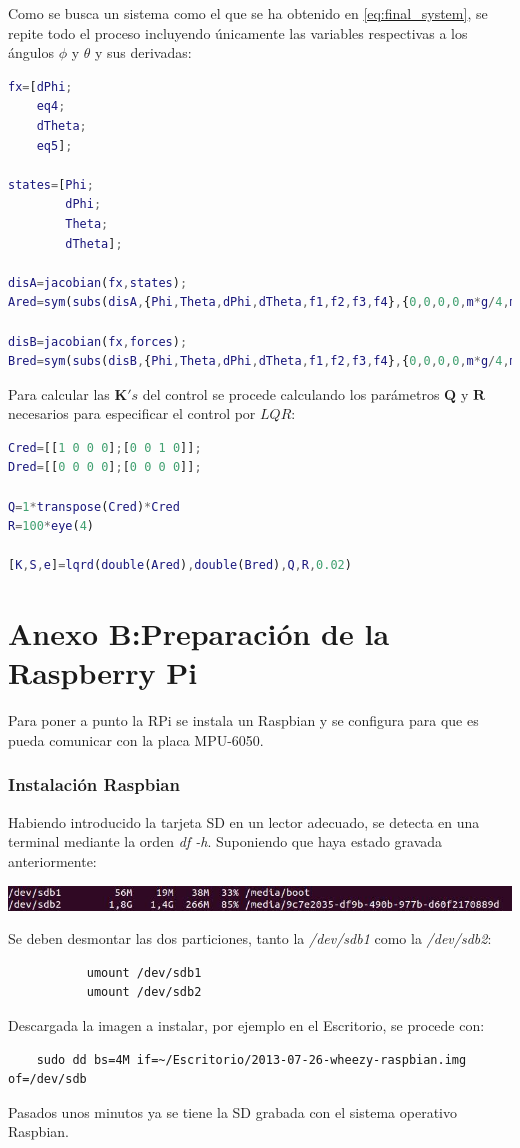 \documentclass[twoside,11pt]{book}
\begin{document}
Como se busca un sistema como el que se ha obtenido en \ref{eq:final_system}, se repite todo el proceso incluyendo únicamente las variables respectivas a los ángulos $\phi$ y $\theta$ y sus derivadas:

\singlespacing
\begin{lstlisting}[language=Matlab,firstnumber=136]
fx=[dPhi;
    eq4;
    dTheta;
    eq5];

states=[Phi;
        dPhi;
        Theta;
        dTheta];
        
disA=jacobian(fx,states);
Ared=sym(subs(disA,{Phi,Theta,dPhi,dTheta,f1,f2,f3,f4},{0,0,0,0,m*g/4,m*g/4,m*g/4,m*g/4}))

disB=jacobian(fx,forces);
Bred=sym(subs(disB,{Phi,Theta,dPhi,dTheta,f1,f2,f3,f4},{0,0,0,0,m*g/4,m*g/4,m*g/4,m*g/4}))        
\end{lstlisting}
\onehalfspacing

Para calcular las $\mathbf{K}'s$ del control se procede calculando los parámetros $\mathbf{Q}$ y $\mathbf{R}$ necesarios para especificar el control por $LQR$:

\singlespacing
\begin{lstlisting}[language=Matlab,firstnumber=151]
Cred=[[1 0 0 0];[0 0 1 0]];
Dred=[[0 0 0 0];[0 0 0 0]];

Q=1*transpose(Cred)*Cred
R=100*eye(4)

[K,S,e]=lqrd(double(Ared),double(Bred),Q,R,0.02)
\end{lstlisting}
\newpage

\section*{Anexo B:Preparación de la Raspberry Pi}
Para poner a punto la RPi se instala un Raspbian y se configura para que es pueda comunicar con la placa MPU-6050.
\subsubsection*{Instalación Raspbian}
Habiendo introducido la tarjeta SD en un lector adecuado, se detecta en una terminal mediante la orden \textit{df -h}. Suponiendo que haya estado gravada anteriormente:
\begin{center}
\includegraphics[scale=0.7,bb=0 0 766 38]{images/InstalRasp1.png}
\end{center}
Se deben desmontar las dos particiones, tanto la \textit{/dev/sdb1} como la \textit{/dev/sdb2}:
\begin{verbatim}
           umount /dev/sdb1
           umount /dev/sdb2
\end{verbatim}
Descargada la imagen a instalar, por ejemplo en el Escritorio, se procede con:
\begin{verbatim}
    sudo dd bs=4M if=~/Escritorio/2013-07-26-wheezy-raspbian.img of=/dev/sdb
\end{verbatim}
Pasados unos minutos ya se tiene la SD grabada con el sistema operativo Raspbian.
\end{document}

